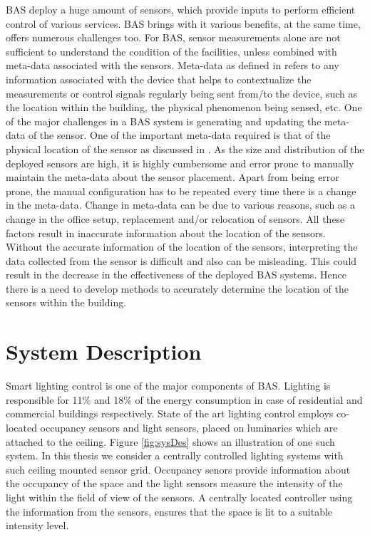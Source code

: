 BAS deploy a huge amount of sensors, which provide inputs to perform efficient control of various services. BAS brings with it various benefits, at the same time, offers numerous challenges too. For BAS, sensor measurements alone are not sufficient to understand the condition of the facilities, unless combined with meta-data associated with the sensors.
Meta-data as defined in \cite{gao2015data} refers to any information associated  with the device that helps to contextualize the measurements or control signals regularly being sent from/to the device, such as the location within the building, the physical phenomenon being sensed, etc. One of the major challenges in a BAS system is generating and updating the meta-data of the sensor.
One of the important meta-data required is that of the physical location of the sensor as discussed in  \cite{liu2009requirements}.
As the size and distribution of the deployed sensors are high, it is highly cumbersome and error prone to manually maintain the meta-data about the sensor placement. Apart from being error prone, the manual configuration has to be repeated every time there is a change in the meta-data. Change in meta-data can be due to various reasons, such as a change in the office setup, replacement and/or relocation of sensors. All these factors result in inaccurate information about the location of the sensors. Without the accurate information of the location of the sensors, interpreting the data collected from the sensor is difficult and also can be misleading. This could result in the decrease in the effectiveness of the deployed BAS systems. Hence there is a need to develop methods to accurately determine the location of the sensors within the building.
\section{System Description}
Smart lighting control is one of the major components of BAS. Lighting is responsible for 11\%  and 18\% of the energy consumption in case of residential and commercial buildings respectively\cite{website}. 
State of the art lighting control employs co-located occupancy sensors and light sensors, placed on luminaries which are attached to the ceiling\cite{pandharipande2015smart,caicedo2016smart,van2014distributed}. Figure \ref{fig:sysDes} shows an illustration of one such system. In this thesis we consider a centrally controlled lighting systems with such ceiling mounted sensor grid. Occupancy senors provide information about the occupancy of the space and the light sensors measure the intensity of the light within the field of view of the sensors. A centrally located controller using the information from the sensors, ensures that the space is lit to a suitable intensity level.

